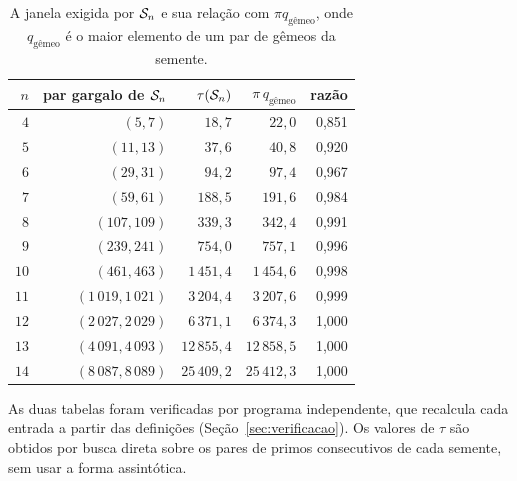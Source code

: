 \begin{table}[htbp]
\centering
\small
\begin{tabular}{rrrrr}
\toprule
$n$ & par gargalo de $\mathcal{S}_n$ & $\tau(\mathcal{S}_n)$ & $\pi\,q_{\text{gêmeo}}$ & razão \\
\midrule
$4$  & $(5,7)$               & $18{,}7$      & $22{,}0$      & 0,851 \\
$5$  & $(11,13)$             & $37{,}6$      & $40{,}8$      & 0,920 \\
$6$  & $(29,31)$             & $94{,}2$      & $97{,}4$      & 0,967 \\
$7$  & $(59,61)$             & $188{,}5$     & $191{,}6$     & 0,984 \\
$8$  & $(107,109)$           & $339{,}3$     & $342{,}4$     & 0,991 \\
$9$  & $(239,241)$           & $754{,}0$     & $757{,}1$     & 0,996 \\
$10$ & $(461,463)$           & $1\,451{,}4$  & $1\,454{,}6$  & 0,998 \\
$11$ & $(1\,019,1\,021)$     & $3\,204{,}4$  & $3\,207{,}6$  & 0,999 \\
$12$ & $(2\,027,2\,029)$     & $6\,371{,}1$  & $6\,374{,}3$  & 1,000 \\
$13$ & $(4\,091,4\,093)$     & $12\,855{,}4$ & $12\,858{,}5$ & 1,000 \\
$14$ & $(8\,087,8\,089)$     & $25\,409{,}2$ & $25\,412{,}3$ & 1,000 \\
\bottomrule
\end{tabular}
\caption{A janela exigida por $\mathcal{S}_n$ e sua relação com $\pi q_{\text{gêmeo}}$,
onde $q_{\text{gêmeo}}$ é o maior elemento de um par de gêmeos da semente.}
\label{tab:dadoslei}
\end{table}

As duas tabelas foram verificadas por programa independente, que recalcula cada
entrada a partir das definições (Seção~\ref{sec:verificacao}). Os valores de
$\tau$ são obtidos por busca direta sobre os pares de primos consecutivos de cada
semente, sem usar a forma assintótica.
